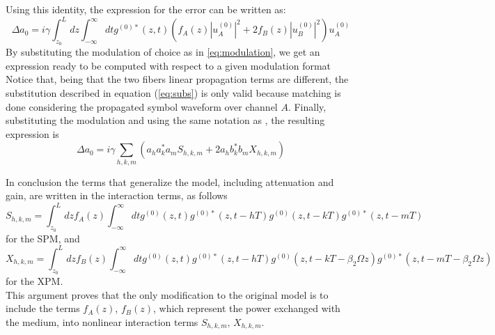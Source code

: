 \documentclass[10pt, lettersize, journal, onecolumn]{IEEEtran}
\begin{document}
Using this identity, the expression for the error can be written as:
\begin{equation}
	\Delta a_0 = i\gamma \int_{z_0}^{L} dz \int_{-\infty}^{\infty} dt g^{(0)*}(z, t) \left(f_A(z)|u_A^{(0)}|^2 + 2 f_B(z)|u_B^{(0)}|^2\right) u_A^{(0)}
\end{equation}
By substituting the modulation of choice as in \ref{eq:modulation}, we get an expression ready to be computed with respect to a given modulation format
Notice that, being that the two fibers linear propagation terms are different, the substitution described in equation (\ref{eq:subs}) is only valid because matching is done considering the propagated symbol waveform over channel $A$.
Finally, substituting the modulation and using the same notation as \cite[eq. 5, 6, 7]{Dar_2013}, the resulting expression is
\begin{equation}
	\Delta a_0 = i \gamma \sum_{h, k, m} \left(a_h a_k^* a_m S_{h, k, m} + 2 a_h b_k^* b_m X_{h, k, m}\right)
\end{equation}

In conclusion the terms that generalize the model, including attenuation and gain, are written in the interaction terms, as follows
\begin{equation}
	S_{h, k, m} = \int_{z_0}^{L} dz f_A(z) \int_{-\infty}^{\infty} dt g^{(0)}(z, t) g^{(0)*}(z, t-hT) g^{(0)}(z, t-kT)g^{(0)*}(z, t-mT)
\end{equation}
for the SPM, and
\begin{equation}\label{eq:hkm}
	X_{h, k, m} = \int_{z_0}^{L} dz f_B(z) \int_{-\infty}^{\infty} dt g^{(0)}(z, t) g^{(0)*}(z, t-hT) g^{(0)}(z, t-kT -\beta_2 \Omega z)g^{(0)*}(z, t-mT-\beta_2 \Omega z)
\end{equation}
for the XPM.\\
This argument proves that the only modification to the original model is to include the terms $f_A(z)$, $f_B(z)$, which represent the power exchanged with the medium, into nonlinear interaction terms $S_{h, k, m}, \, X_{h, k, m}$. 
\end{document}
